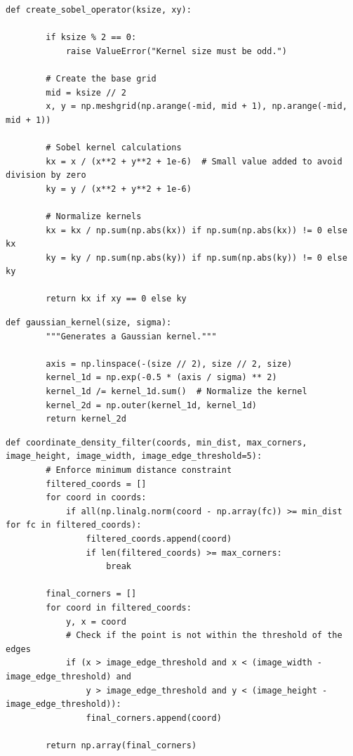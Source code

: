 \documentclass[11pt, conference, letterpaper]{IEEEtran}
\begin{document}
\begin{lstlisting}[style=python, caption={Sobel Kernel}, label={lst:sobel-kernel}]
    def create_sobel_operator(ksize, xy):

        if ksize % 2 == 0:
            raise ValueError("Kernel size must be odd.")
        
        # Create the base grid
        mid = ksize // 2
        x, y = np.meshgrid(np.arange(-mid, mid + 1), np.arange(-mid, mid + 1))
        
        # Sobel kernel calculations
        kx = x / (x**2 + y**2 + 1e-6)  # Small value added to avoid division by zero
        ky = y / (x**2 + y**2 + 1e-6)
        
        # Normalize kernels
        kx = kx / np.sum(np.abs(kx)) if np.sum(np.abs(kx)) != 0 else kx
        ky = ky / np.sum(np.abs(ky)) if np.sum(np.abs(ky)) != 0 else ky
        
        return kx if xy == 0 else ky
\end{lstlisting}

\newpage
\begin{lstlisting}[style=python, caption={Gaussian Kernel}, label={lst:gaussian-kernel}]
    def gaussian_kernel(size, sigma):
        """Generates a Gaussian kernel."""
                
        axis = np.linspace(-(size // 2), size // 2, size)
        kernel_1d = np.exp(-0.5 * (axis / sigma) ** 2)
        kernel_1d /= kernel_1d.sum()  # Normalize the kernel
        kernel_2d = np.outer(kernel_1d, kernel_1d)
        return kernel_2d
\end{lstlisting}

\begin{lstlisting}[style=python, caption={Corner Density Filter}, label={lst:corner_filter}]
    def coordinate_density_filter(coords, min_dist, max_corners, image_height, image_width, image_edge_threshold=5):
        # Enforce minimum distance constraint
        filtered_coords = []
        for coord in coords:
            if all(np.linalg.norm(coord - np.array(fc)) >= min_dist for fc in filtered_coords):
                filtered_coords.append(coord)
                if len(filtered_coords) >= max_corners:
                    break

        final_corners = []    
        for coord in filtered_coords:
            y, x = coord
            # Check if the point is not within the threshold of the edges
            if (x > image_edge_threshold and x < (image_width - image_edge_threshold) and
                y > image_edge_threshold and y < (image_height - image_edge_threshold)):
                final_corners.append(coord)

        return np.array(final_corners)
\end{lstlisting}
\twocolumn
\end{document}
